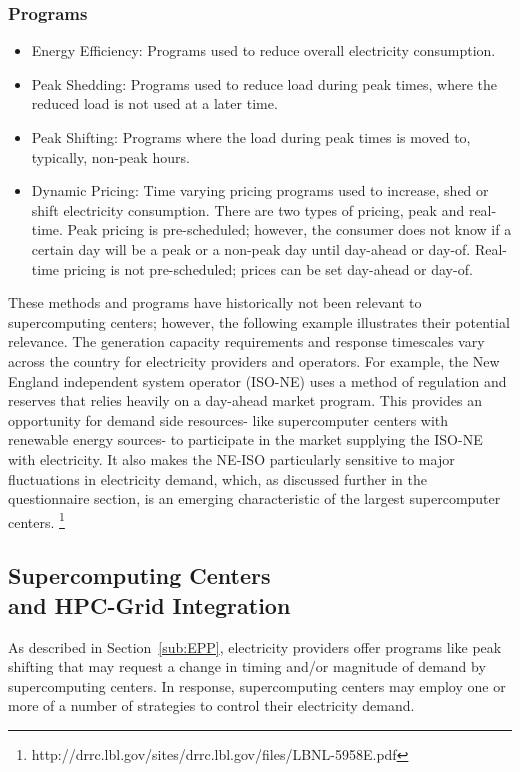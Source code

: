 \subsubsection{Programs}
\begin{itemize}
\item Energy Efficiency:  Programs used to reduce overall electricity consumption.
\item Peak Shedding:  Programs used to reduce load during peak times, 
where the reduced load is not used at a later time. 
\item Peak Shifting:  Programs where the load during peak times is moved to, typically, non-peak hours. 
\item Dynamic Pricing:  Time varying pricing programs used to increase, shed or shift electricity consumption. 
There are two types of pricing, peak and real-time.  Peak pricing is pre-scheduled; however, the consumer 
does not know if a certain day will be a peak or a non-peak day until day-ahead or day-of.  
Real-time pricing is not pre-scheduled; prices can be set day-ahead or day-of.
\end{itemize}

These methods and programs have historically not been relevant to supercomputing centers; however, 
the following example illustrates their potential relevance.
The generation capacity requirements and response timescales vary across the country for electricity 
providers and operators. For example, the New England independent system operator (ISO-NE) uses a method 
of regulation and reserves that relies heavily on a day-ahead market program. This provides an opportunity 
for demand side resources- like supercomputer centers with renewable energy sources- to participate in the 
market supplying the ISO-NE with electricity.  It also makes the NE-ISO particularly sensitive to major 
fluctuations in electricity demand, which, as discussed further in the questionnaire section, is an emerging 
characteristic of the largest supercomputer centers.  
\footnote {http://drrc.lbl.gov/sites/drrc.lbl.gov/files/LBNL-5958E.pdf}

\subsection{Supercomputing Centers\\
and HPC-Grid Integration}

As described in Section~\ref{sub:EPP}, electricity providers offer programs like peak shifting that may request 
a change in timing and/or magnitude of demand by supercomputing centers.  
In response, supercomputing centers may employ one or more of a number of strategies to control their 
electricity demand.


